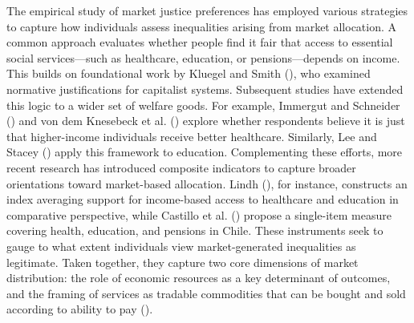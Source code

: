 \documentclass[
  13pt,
]{article}
\begin{document}
The empirical study of market justice preferences has employed various
strategies to capture how individuals assess inequalities arising from
market allocation. A common approach evaluates whether people find it
fair that access to essential social services---such as healthcare,
education, or pensions---depends on income. This builds on foundational
work by Kluegel and Smith
(), who examined normative
justifications for capitalist systems. Subsequent studies have extended
this logic to a wider set of welfare goods. For example, Immergut and
Schneider () and von dem Knesebeck
et al. () explore whether
respondents believe it is just that higher-income individuals receive
better healthcare. Similarly, Lee and Stacey
() apply this framework to
education. Complementing these efforts, more recent research has
introduced composite indicators to capture broader orientations toward
market-based allocation. Lindh (),
for instance, constructs an index averaging support for income-based
access to healthcare and education in comparative perspective, while
Castillo et al. ()
propose a single-item measure covering health, education, and pensions
in Chile. These instruments seek to gauge to what extent individuals
view market-generated inequalities as legitimate. Taken together, they
capture two core dimensions of market distribution: the role of economic
resources as a key determinant of outcomes, and the framing of services
as tradable commodities that can be bought and sold according to ability
to pay ().
\end{document}
